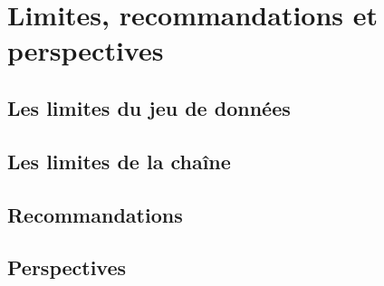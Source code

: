 
\chapter{Limites, recommandations et perspectives}

\section{Les limites du jeu de données}

\section{Les limites de la chaîne}

\section{Recommandations}

\section{Perspectives}
